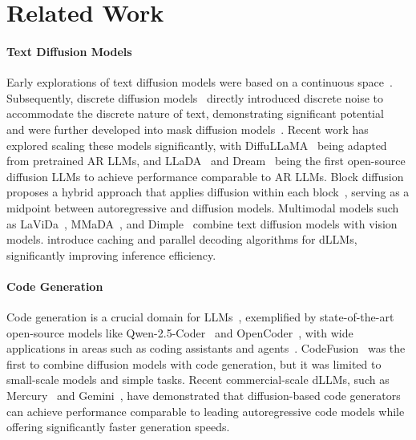 \section{Related Work}
\paragraph{Text Diffusion Models}
Early explorations of text diffusion models were based on a continuous space~\citep{li2022diffusion,gong2022diffuseq,DBLP:conf/iclr/ChenZH23}. Subsequently, discrete diffusion models~\citep{hoogeboom2021argmax,austin2021structured} directly introduced discrete noise to accommodate the discrete nature of text, demonstrating significant potential~\citep{Zheng2023ARD,lou2023discrete} and were further developed into mask diffusion models~\citep{shi2024simplified, ou2024your, sahoo2024simple}.
Recent work has explored scaling these models significantly, with DiffuLLaMA~\citep{gong2025scaling} being adapted from pretrained AR LLMs, and LLaDA~\citep{nie2024scaling} and Dream~\citep{dream2025} being the first open-source diffusion LLMs to achieve performance comparable to AR LLMs. Block diffusion~\citep{arriola2025block} proposes a hybrid approach that applies diffusion within each block~\citep{han-etal-2023-ssd}, serving as a midpoint between autoregressive and diffusion models. Multimodal models such as LaViDa~\citep{li2025lavida}, MMaDA~\citep{yang2025mmada}, and Dimple~\citep{yu2025dimple} combine text diffusion models with vision models. \citet{liu2025dllm, hu2025accelerating, ma2025dkv, fastdllm2025,sahoo2025esotericlanguagemodels} introduce caching and parallel decoding algorithms for dLLMs, significantly improving inference efficiency.

\paragraph{Code Generation}
Code generation is a crucial domain for LLMs~\citep{roziere2023code,sun2024survey}, exemplified by state-of-the-art open-source models like Qwen-2.5-Coder~\citep{hui2024qwen2} and OpenCoder~\citep{huang2024opencoder}, with wide applications in areas such as coding assistants and agents~\citep{xu2024lemur}.
CodeFusion~\citep{singh2023codefusion} was the first to combine diffusion models with code generation, but it was limited to small-scale models and simple tasks. Recent commercial-scale dLLMs, such as Mercury~\citep{inception2025mercury} and Gemini~\citep{geminidiffusion}, have demonstrated that diffusion-based code generators can achieve performance comparable to leading autoregressive code models while offering significantly faster generation speeds. 

